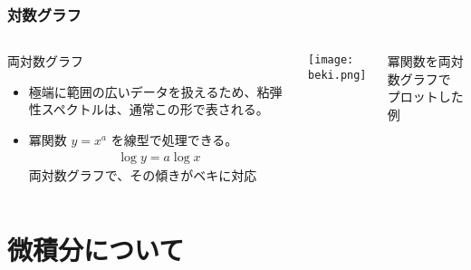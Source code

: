 \documentclass[12pt, dvipdfmx]{beamer}
\begin{document}
\begin{frame}
	\frametitle{対数グラフ}
	\begin{columns}[T, onlytextwidth]
			\begin{exampleblock}{両対数グラフ}
				\begin{itemize}
					\item 極端に範囲の広いデータを扱えるため、粘弾性スペクトルは、通常この形で表される。
					\item 冪関数 $y = x^a$ を線型で処理できる。
					\begin{align*}
						\log y = a \log x
					\end{align*}
					両対数グラフで、その傾きがベキに対応
				\end{itemize}
			\end{exampleblock}
			\vspace{5mm}
			\texttt{[image: beki.png]}

			冪関数を両対数グラフで\\プロットした例
	\end{columns}
	
\end{frame}

\section{微積分について}
\end{document}
